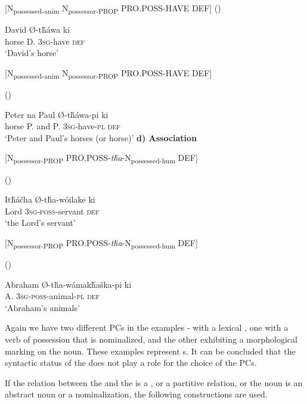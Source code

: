 \documentclass[output=paper]{LSP/langsci}
\begin{document}
[N\textsubscript{possessed-anim} N\textsubscript{possessor-PROP} PRO.POSS-HAVE DEF] 
\ea	{} (\citealt[91]{Buechel1939}) \label{lakotadavidshorse}

   David   Ø-t\v{h}áwa    ki \\
horse      D.   \textsc{3sg}-have  \textsc{def} \\
\glt `David's horse'
\z

[N\textsubscript{possessed-anim} N\textsubscript{possessor-PROP} PRO.POSS-HAVE DEF]

\ea {} (\citealt[91]{Buechel1939})

 Peter  na  Paul   Ø-t\v{h}áwa-pi     ki  \\
horse    P.       and P.      \textsc{3sg}-have-\textsc{pl} \textsc{def} \\
\glt `Peter and Paul's horses (or horse)'
\z
\textbf{d)	Association}

[N\textsubscript{possessor-PROP} PRO.POSS-\textit{t\v{h}a}-N\textsubscript{possessed-hum} DEF]

\ea	{} (\citealt[92]{Buechel1939})

\gll It\v{h}\'a\v{c}ha    Ø-t\v{h}a-wóilake   ki  \\
Lord   \textsc{3sg-poss}-servant   \textsc{def} \\
\glt `the Lord's servant'
\z

[N\textsubscript{possessor-PROP} PRO.POSS-\textit{t\v{h}a}-N\textsubscript{possessed-hum} DEF]

\ea	{} (\citealt[92]{Buechel1939}) \label{lakotaabraham}

\gll Abraham Ø-t\v{h}a-w\'amak\v{h}a\v{s}ka-pi ki  \\
 A. \textsc{3sg-poss}-animal-\textsc{pl}  \textsc{def} \\
\glt `Abraham's animals'
\z

Again we have two different PCs in the examples - with a lexical , one with a verb of possession that is nominalized, and the other exhibiting a morphological  marking on the  noun. These examples represent s. It can be concluded that the syntactic status of the  does not play a role for the choice of the PCs.

If the relation between the  and the  is a , or a partitive relation, or the  noun is an abstract noun or a nominalization, the following constructions are used. 
\end{document}
